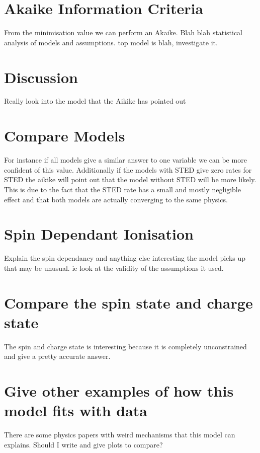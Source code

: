 \documentclass[prl]{revtex4}
\begin{document}




\section{Akaike Information Criteria}
From the minimisation value we can perform an Akaike.
Blah blah statistical analysis of models and assumptions.
top model is blah, investigate it.

\section{Discussion}
Really look into the model that the Aikike has pointed out

\section{Compare Models}
For instance if all models give a similar answer to one variable we can be more confident of this value. Additionally if the models with STED give zero rates for STED the aikike will point out that the model without STED will be more likely. This is due to the fact that the STED rate has a small and mostly negligible effect and that both models are actually converging to the same physics.

\section{Spin Dependant Ionisation}
Explain the spin dependancy and anything else interesting the model picks up that may be unusual. ie look at the validity of the assumptions it used.


\section{Compare the spin state and charge state}
The spin and charge state is interesting because it is completely unconstrained and give a pretty accurate answer.
\section{Give other examples of how this model fits with data}
There are some physics papers with weird mechanisms that this model can explains. Should I write and give plots to compare?
\end{document}
